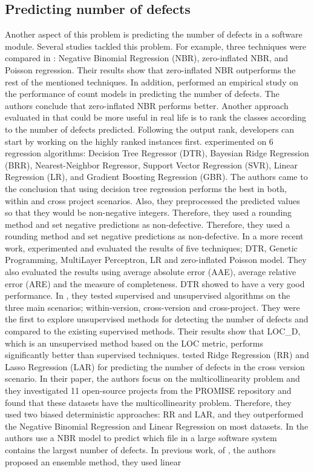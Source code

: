 \documentclass[]{article}
\begin{document}
	\subsection{Predicting number of defects}
	\indent Another aspect of this problem is predicting the number of defects in a software module. Several studies tackled this problem. For example, three techniques were compared in \cite{janes2006identification}: Negative Binomial Regression (NBR), zero-inflated NBR, and Poisson regression. Their results show that zero-inflated NBR outperforms the rest of the mentioned techniques. In addition, \cite{gao2007comprehensive} performed an empirical study on the performance of count models in predicting the number of defects. The authors conclude that zero-inflated NBR performs better. Another approach evaluated in \cite{d2012evaluating} that could be more useful in real life is to rank the classes according to the number of defects predicted. Following the output rank, developers can start by working on the highly ranked instances first. \cite{chen2015empirical} experimented on 6 regression algorithms: Decision Tree Regressor (DTR), Bayesian Ridge Regression (BRR), Nearest-Neighbor Regressor, Support Vector Regression (SVR), Linear Regression (LR), and Gradient Boosting Regression (GBR). The authors came to the conclusion that using decision tree regression performs the best in both, within and cross project scenarios. Also, they preprocessed the predicted values so that they would be non-negative integers. Therefore, they used a rounding method and set negative predictions as non-defective. Therefore, they used a rounding method and set negative predictions as non-defective. In a more recent work, \cite{rathore2017empirical} experimented and evaluated the results of five techniques; DTR, Genetic Programming, MultiLayer Perceptron, LR and zero-inflated Poisson model. They also evaluated the results using average absolute error (AAE), average relative error (ARE) and the measure of completeness. DTR showed to have a very good performance. In \cite{chen2019software}, they tested supervised and unsupervised algorithms on the three main scenarios; within-version, cross-version and cross-project. They were the first to explore unsupervised methods for detecting the number of defects and compared to the existing supervised methods. Their results show that LOC\_D, which is an unsupervised method based on the LOC metric, performs significantly better than supervised techniques. \cite{yang2018ridge} tested Ridge Regression (RR) and Lasso Regression (LAR) for predicting the number of defects in the cross version scenario. In their paper, the authors focus on the multicollinearity problem and they investigated 11 open-source projects from the PROMISE repository and found that these datasets have the multicollinearity problem. Therefore, they used two biased deterministic approaches: RR and LAR, and they outperformed the Negative Binomial Regression and Linear Regression on most datasets. In \cite{ostrand2005predicting} the authors use a NBR model to predict which file in a large software system contains the largest number of defects. In previous work, of \cite{rathore2017towards}, the authors proposed an ensemble method, they used linear 
\end{document}
